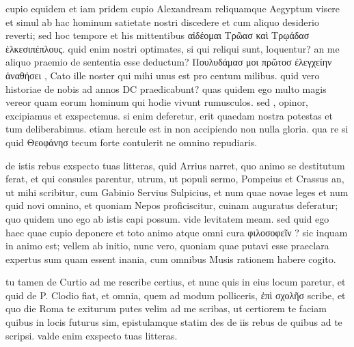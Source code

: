 


 cupio equidem et iam pridem cupio Alexandream reliquamque Aegyptum visere et simul ab hac hominum satietate nostri discedere et cum aliquo desiderio reverti; sed hoc tempore et his mittentibus αἰδέομαι Τρῶασ καὶ Τρῳάδασ ἑλκεσιπέπλους. quid enim nostri optimates, si qui reliqui sunt, loquentur? an me aliquo praemio de sententia esse deductum? Πουλυδάμασ μοι πρῶτοσ ἐλεγχείην ἀναθήσει , Cato ille noster qui mihi unus est pro centum milibus. quid vero historiae de nobis ad annos DC praedicabunt? quas quidem ego multo magis vereor quam eorum hominum qui hodie vivunt rumusculos. sed , opinor, excipiamus et exspectemus. si enim deferetur, erit quaedam nostra potestas et tum deliberabimus. etiam hercule est in non accipiendo non nulla gloria. qua re si quid Θεοφάνησ tecum forte contulerit ne omnino repudiaris.

 de istis rebus exspecto tuas litteras, quid Arrius narret, quo animo se destitutum ferat, et qui consules parentur, utrum, ut populi sermo, Pompeius et Crassus an, ut mihi scribitur, cum Gabinio Servius Sulpicius, et num quae novae leges et num quid novi omnino, et quoniam Nepos proficiscitur, cuinam auguratus deferatur; quo quidem uno ego ab istis capi possum. vide levitatem meam. sed quid ego haec quae cupio deponere et toto animo atque omni cura φιλοσοφεῖν ? sic inquam in animo est; vellem ab initio, nunc vero, quoniam quae putavi esse praeclara expertus sum quam essent inania, cum omnibus Musis rationem habere cogito.

 tu tamen de Curtio ad me rescribe certius, et nunc quis in eius locum paretur, et quid de P. Clodio fiat, et omnia, quem ad modum polliceris, ἐπὶ σχολῆσ scribe, et quo die Roma te exiturum putes velim ad me scribas, ut certiorem te faciam quibus in locis futurus sim, epistulamque statim des de iis rebus de quibus ad te scripsi. valde enim exspecto tuas litteras.
